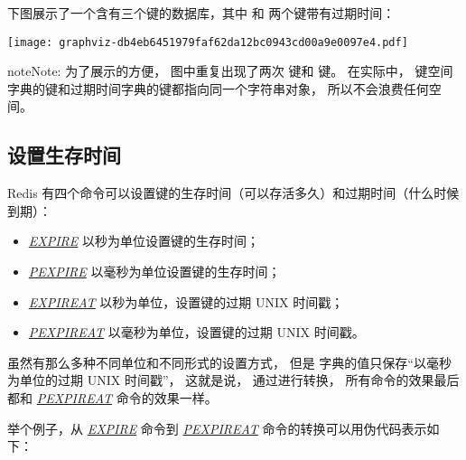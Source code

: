 \documentclass[a4paper,11pt,english]{sphinxmanual}
\begin{document}
下图展示了一个含有三个键的数据库，其中  和  两个键带有过期时间：

\texttt{[image: graphviz-db4eb6451979faf62da12bc0943cd00a9e0097e4.pdf]}

\begin{notice}{note}{Note:}
为了展示的方便，
图中重复出现了两次  键和  键。
在实际中，
键空间字典的键和过期时间字典的键都指向同一个字符串对象，
所以不会浪费任何空间。
\end{notice}


\subsection{设置生存时间}
\label{internal/db:id13}
Redis 有四个命令可以设置键的生存时间（可以存活多久）和过期时间（什么时候到期）：
\begin{itemize}
\item {} 
\href{http://redis.readthedocs.org/en/latest/key/expire.html\#expire}{\emph{EXPIRE}} 以秒为单位设置键的生存时间；

\item {} 
\href{http://redis.readthedocs.org/en/latest/key/pexpire.html\#pexpire}{\emph{PEXPIRE}} 以毫秒为单位设置键的生存时间；

\item {} 
\href{http://redis.readthedocs.org/en/latest/key/expireat.html\#expireat}{\emph{EXPIREAT}} 以秒为单位，设置键的过期 UNIX 时间戳；

\item {} 
\href{http://redis.readthedocs.org/en/latest/key/pexpireat.html\#pexpireat}{\emph{PEXPIREAT}} 以毫秒为单位，设置键的过期 UNIX 时间戳。

\end{itemize}

虽然有那么多种不同单位和不同形式的设置方式，
但是  字典的值只保存“以毫秒为单位的过期 UNIX 时间戳”，
这就是说，
通过进行转换，
所有命令的效果最后都和 \href{http://redis.readthedocs.org/en/latest/key/pexpireat.html\#pexpireat}{\emph{PEXPIREAT}} 命令的效果一样。

举个例子，从 \href{http://redis.readthedocs.org/en/latest/key/expire.html\#expire}{\emph{EXPIRE}} 命令到 \href{http://redis.readthedocs.org/en/latest/key/pexpireat.html\#pexpireat}{\emph{PEXPIREAT}} 命令的转换可以用伪代码表示如下：
\end{document}
